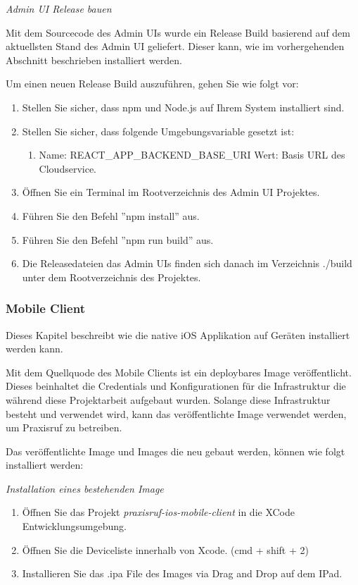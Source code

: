 \textit{Admin UI Release bauen}

Mit dem Sourcecode des Admin UIs wurde ein Release Build basierend auf dem aktuellsten Stand des Admin UI geliefert.
Dieser kann, wie im vorhergehenden Abschnitt beschrieben installiert werden.

Um einen neuen Release Build auszuführen, gehen Sie wie folgt vor:

\begin{enumerate}
    \item Stellen Sie sicher, dass npm und Node.js auf Ihrem System installiert sind.
    \item Stellen Sie sicher, dass folgende Umgebungsvariable gesetzt ist:
    \begin{enumerate}
        \item Name: REACT\_APP\_BACKEND\_BASE\_URI   Wert: Basis URL des Cloudservice.   
    \end{enumerate}
    \item Öffnen Sie ein Terminal im Rootverzeichnis des Admin UI Projektes.
    \item Führen Sie den Befehl ''npm install''  aus.
    \item Führen Sie den Befehl ''npm run build'' aus.
    \item Die Releasedateien das Admin UIs finden sich danach im Verzeichnis ./build unter dem Rootverzeichnis des Projektes. 
\end{enumerate}


\clearpage

\subsubsection*{Mobile Client}

Dieses Kapitel beschreibt wie die native iOS Applikation auf Geräten installiert werden kann.

Mit dem Quellquode des Mobile Clients ist ein deploybares Image veröffentlicht.
Dieses beinhaltet die Credentials und Konfigurationen für die Infrastruktur die während diese Projektarbeit aufgebaut wurden.
Solange diese Infrastruktur besteht und verwendet wird, kann das veröffentlichte Image verwendet werden, um Praxisruf zu betreiben.

Das veröffentlichte Image und Images die neu gebaut werden, können wie folgt installiert werden:

\textit{Installation eines bestehenden Image}

\begin{enumerate}
    \item Öffnen Sie das Projekt \textit{praxisruf-ios-mobile-client} in die XCode Entwicklungsumgebung.
    \item Öffnen Sie die Deviceliste innerhalb von Xcode. (cmd + shift + 2)
    \item Installieren Sie das .ipa File des Images via Drag and Drop auf dem IPad.
\end{enumerate}

